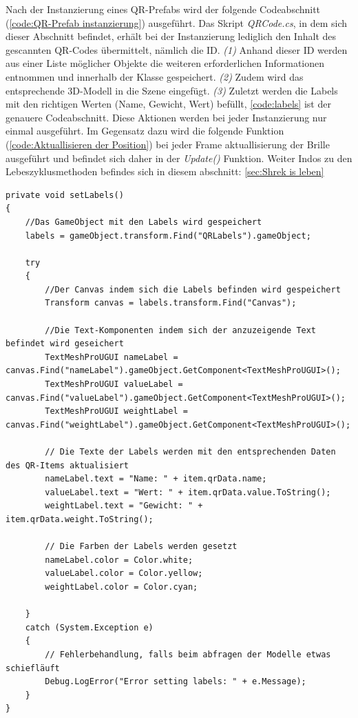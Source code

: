 Nach der Instanzierung eines QR-Prefabs wird der folgende Codeabschnitt (\ref{code:QR-Prefab instanzierung}) ausgeführt. Das Skript \textit{QRCode.cs}, in dem sich dieser Abschnitt befindet, erhält bei der Instanzierung lediglich den Inhalt des gescannten QR-Codes übermittelt, nämlich die ID. \textit{(1)} Anhand dieser ID werden aus einer Liste möglicher Objekte die weiteren erforderlichen Informationen entnommen und innerhalb der Klasse gespeichert. \textit{(2)} Zudem wird das entsprechende 3D-Modell in die Szene eingefügt. \textit{(3)} Zuletzt werden die Labels mit den richtigen Werten (Name, Gewicht, Wert) befüllt, \ref{code:labels} ist der genauere Codeabschnitt. Diese Aktionen werden bei jeder Instanzierung nur einmal ausgeführt. Im Gegensatz dazu wird die folgende Funktion (\ref{code:Aktuallisieren der Position}) bei jeder Frame aktuallisierung der Brille ausgeführt und befindet sich daher in der \textit{Update()} Funktion. Weiter Indos zu den Lebeszyklusmethoden befindes sich in diesem abschnitt: \ref{sec:Shrek is leben}

\begin{lstlisting}[style=csharp, caption={Setzen der Labels}, label=code:labels]
private void setLabels()
{
    //Das GameObject mit den Labels wird gespeichert
    labels = gameObject.transform.Find("QRLabels").gameObject;

    try
    {
        //Der Canvas indem sich die Labels befinden wird gespeichert
        Transform canvas = labels.transform.Find("Canvas");

        //Die Text-Komponenten indem sich der anzuzeigende Text befindet wird geseichert
        TextMeshProUGUI nameLabel = canvas.Find("nameLabel").gameObject.GetComponent<TextMeshProUGUI>();
        TextMeshProUGUI valueLabel = canvas.Find("valueLabel").gameObject.GetComponent<TextMeshProUGUI>();
        TextMeshProUGUI weightLabel = canvas.Find("weightLabel").gameObject.GetComponent<TextMeshProUGUI>();

        // Die Texte der Labels werden mit den entsprechenden Daten des QR-Items aktualisiert
        nameLabel.text = "Name: " + item.qrData.name;
        valueLabel.text = "Wert: " + item.qrData.value.ToString();
        weightLabel.text = "Gewicht: " + item.qrData.weight.ToString();

        // Die Farben der Labels werden gesetzt
        nameLabel.color = Color.white;
        valueLabel.color = Color.yellow;
        weightLabel.color = Color.cyan;

    }
    catch (System.Exception e)
    {
        // Fehlerbehandlung, falls beim abfragen der Modelle etwas schiefläuft
        Debug.LogError("Error setting labels: " + e.Message);
    }
}
\end{lstlisting}

